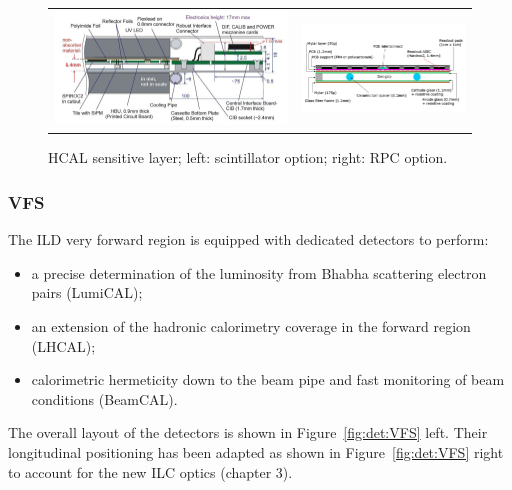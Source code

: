 \begin{figure}[t!]
\begin{tabular}{cc}
\includegraphics[width=0.5\hsize,viewport={0 -10 600 500},clip]{Detector/fig/AHCAL_layer.png} &
\includegraphics[width=0.5\hsize]{Detector/fig/SDHCAL_layer.png}
\end{tabular}
\caption{HCAL sensitive layer; left: scintillator option; right: RPC option.}
\label{fig:det:HCAL_readout}
\end{figure}


\vspace{1cm}
\subsubsection*{\bf VFS}

The ILD very forward region is equipped with dedicated detectors to perform:
\begin{itemize}
\item a precise determination of the luminosity from Bhabha scattering electron pairs (LumiCAL);
\item an extension of the hadronic calorimetry coverage in the forward region (LHCAL);
\item calorimetric hermeticity down to the beam pipe and fast monitoring of beam conditions (BeamCAL).
\end{itemize}
The overall layout of the detectors is shown in Figure~\ref{fig:det:VFS} left. Their longitudinal positioning has been adapted as shown in Figure~\ref{fig:det:VFS} right to account for the new ILC optics (chapter 3).  

